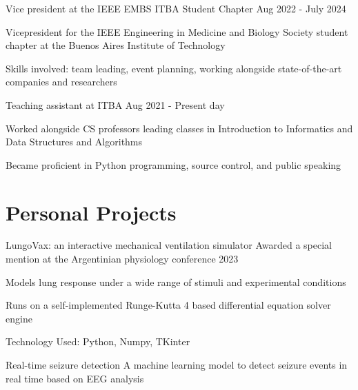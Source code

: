     \resumeSubheading
    { Vice president at the IEEE EMBS ITBA Student Chapter }{}
      {}{Aug 2022 - July 2024}
      \vspace{-5mm}
      \resumeItemListStart
    \item {Vicepresident for the IEEE Engineering in Medicine and Biology Society student chapter at the Buenos Aires Institute of Technology}
    \item {Skills involved: team leading, event planning, working alongside state-of-the-art companies and researchers}
    \resumeItemListEnd


    \resumeSubheading
      {Teaching assistant at ITBA}{}
      {}{Aug 2021 - Present day}
      \resumeItemListStart
      \vspace{-5mm}
    \item {Worked alongside CS professors leading classes in Introduction to Informatics and Data Structures and Algorithms}
    \item {Became proficient in Python programming, source control, and public speaking}
    \resumeItemListEnd
  \resumeSubHeadingListEnd

\vspace{-5.0mm}
\section{\textbf{Personal Projects}}
\resumeSubHeadingListStart
    \resumeProject
      {LungoVax: an interactive mechanical ventilation simulator} %
      {Awarded a special mention at the Argentinian physiology conference 2023} %
      {} %

      \resumeItemListStart
        \item {Models lung response under a wide range of stimuli and experimental conditions}
        \item {Runs on a self-implemented Runge-Kutta 4 based differential equation solver engine}
        \item {Technology Used: Python, Numpy, TKinter}
    \resumeItemListEnd
    \vspace{0.5mm}

    \resumeProject
      {Real-time seizure detection} %
      {A machine learning model to detect seizure events in real time based on EEG analysis} %
      {} %

